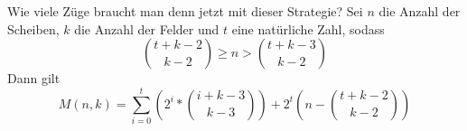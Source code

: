 \begin{frame}{Wie viele Züge braucht man denn jetzt mit dieser Strategie?}
    Sei $n$ die Anzahl der Scheiben, $k$ die Anzahl der Felder und $t$ eine natürliche Zahl, sodass
    \[\binom{t+k-2}{k-2}\geq n>\binom{t+k-3}{k-2}\]
    Dann gilt
    \[M(n,k)=\sum_{i=0}^{t}\left(2^i*\binom{i+k-3}{k-3}\right)+2^t\left(n-\binom{t+k-2}{k-2}\right)\]
\end{frame}